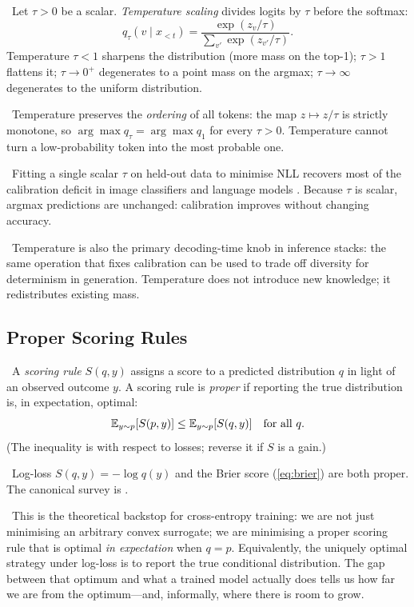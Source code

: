 \Def\ Let $\tau > 0$ be a scalar. \emph{Temperature scaling} divides
logits by $\tau$ before the softmax:
\begin{equation}
q_\tau(v \mid x_{<t}) = \frac{\exp(z_v / \tau)}{\sum_{v'} \exp(z_{v'} / \tau)}.
\label{eq:temperature}
\end{equation}
Temperature $\tau < 1$ sharpens the distribution (more mass on the
top-1); $\tau > 1$ flattens it; $\tau \to 0^+$ degenerates to a point
mass on the argmax; $\tau \to \infty$ degenerates to the uniform
distribution.

\Ident\ Temperature preserves the \emph{ordering} of all tokens: the
map $z \mapsto z/\tau$ is strictly monotone, so
$\arg\max q_\tau = \arg\max q_1$ for every $\tau > 0$. Temperature
cannot turn a low-probability token into the most probable one.

\Emp\ Fitting a single scalar $\tau$ on held-out data to minimise NLL
recovers most of the calibration deficit in image classifiers and
language models \citep{guo2017calibration}. Because $\tau$ is scalar,
argmax predictions are unchanged: calibration improves without
changing accuracy.

\Cons\ Temperature is also the primary decoding-time knob in
inference stacks: the same operation that fixes calibration can be
used to trade off diversity for determinism in generation. Temperature
does not introduce new knowledge; it redistributes existing mass.

\subsection{Proper Scoring Rules}

\Def\ A \emph{scoring rule} $S(q, y)$ assigns a score to a predicted
distribution $q$ in light of an observed outcome $y$. A scoring rule is
\emph{proper} if reporting the true distribution is, in expectation,
optimal:
\begin{equation}
\mathbb{E}_{y \sim p}[S(p, y)] \le \mathbb{E}_{y \sim p}[S(q, y)] \quad \text{for all } q.
\end{equation}
(The inequality is with respect to losses; reverse it if $S$ is a
gain.)

\Ident\ Log-loss $S(q, y) = -\log q(y)$ and the Brier score
(\ref{eq:brier}) are both proper. The canonical survey is
\citet{gneiting2007strictly}.

\Cons\ This is the theoretical backstop for cross-entropy training:
we are not just minimising an arbitrary convex surrogate; we are
minimising a proper scoring rule that is optimal \emph{in expectation}
when $q = p$. Equivalently, the uniquely optimal strategy under
log-loss is to report the true conditional distribution. The gap
between that optimum and what a trained model actually does tells us
how far we are from the optimum---and, informally, where there is room
to grow.

